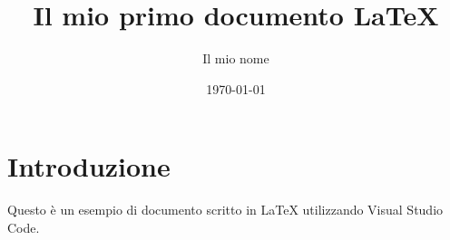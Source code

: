 \documentclass{article}
\title{Il mio primo documento LaTeX}
\author{Il mio nome}
\date{\today}
\begin{document}
\maketitle

\section{Introduzione}
Questo è un esempio di documento scritto in \LaTeX{} utilizzando Visual Studio Code.
\end{document}
